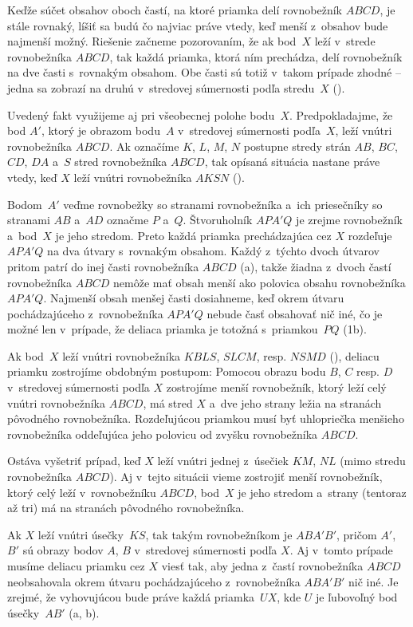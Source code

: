 {%
Keďže súčet obsahov oboch častí, na ktoré priamka delí rovnobežník $ABCD$, je stále rovnaký, líšiť sa budú čo najviac práve vtedy, keď menší z~obsahov bude najmenší možný. Riešenie začneme pozorovaním, že ak bod~$X$ leží v~strede rovnobežníka $ABCD$, tak každá priamka, ktorá ním prechádza, delí rovnobežník na dve časti s~rovnakým obsahom. Obe časti sú totiž v~takom prípade zhodné -- jedna sa zobrazí na druhú v~stredovej súmernosti podľa stredu~$X$ (\obr).

Uvedený fakt využijeme aj pri všeobecnej polohe bodu~$X$. Predpokladajme, že bod $A'$, ktorý je obrazom bodu~$A$ v~stredovej súmernosti podľa~$X$, leží vnútri rovnobežníka $ABCD$. Ak označíme $K$, $L$, $M$, $N$ postupne stredy strán $AB$, $BC$, $CD$, $DA$ a~$S$ stred rovnobežníka $ABCD$, tak opísaná situácia nastane práve vtedy, keď $X$ leží vnútri rovnobežníka $AKSN$ (\obr).
%

Bodom~$A'$ veďme rovnobežky so stranami rovnobežníka a~ich priesečníky so stranami $AB$ a~$AD$ označme $P$ a~$Q$. Štvoruholník $APA'Q$ je zrejme rovnobežník a~bod~$X$ je jeho stredom. Preto každá priamka prechádzajúca cez $X$ rozdeľuje $APA'Q$ na dva útvary s~rovnakým obsahom. Každý z~týchto dvoch útvarov pritom patrí do inej časti rovnobežníka $ABCD$ (\obr a), takže žiadna z~dvoch častí rovnobežníka $ABCD$ nemôže mať obsah menší ako polovica obsahu rovnobežníka $APA'Q$. Najmenší obsah menšej časti dosiahneme, keď okrem útvaru pochádzajúceho z~rovnobežníka $APA'Q$ nebude časť obsahovať nič iné, čo je možné len v~prípade, že deliaca priamka je totožná s~priamkou~$PQ$ (\obrr1b).
%

Ak bod~$X$ leží vnútri rovnobežníka $KBLS$, $SLCM$, resp. $NSMD$ (), deliacu priamku zostrojíme obdobným postupom: Pomocou obrazu bodu $B$, $C$ resp. $D$ v~stredovej súmernosti podľa $X$ zostrojíme menší rovnobežník, ktorý leží celý vnútri rovnobežníka $ABCD$, má stred $X$ a~dve jeho strany ležia na stranách pôvodného rovnobežníka. Rozdeľujúcou priamkou musí byť uhlopriečka menšieho rovnobežníka oddeľujúca jeho polovicu od zvyšku rovnobežníka $ABCD$.

Ostáva vyšetriť prípad, keď $X$ leží vnútri jednej z~úsečiek $KM$, $NL$ (mimo stredu rovnobežníka $ABCD$). Aj v~tejto situácii vieme zostrojiť menší rovnobežník, ktorý celý leží v~rovnobežníku $ABCD$, bod~$X$ je jeho stredom a~strany (tentoraz až tri) má na stranách pôvodného rovnobežníka.
%

Ak $X$ leží vnútri úsečky~$KS$, tak takým rovnobežníkom je $ABA'B'$, pričom $A'$, $B'$ sú obrazy bodov $A$, $B$ v~stredovej súmernosti podľa $X$.
Aj v~tomto prípade musíme deliacu priamku cez $X$ viesť tak, aby jedna z~častí rovnobežníka $ABCD$ neobsahovala okrem útvaru pochádzajúceho z~rovnobežníka $ABA'B'$ nič iné. Je zrejmé, že vyhovujúcou bude práve každá priamka~$UX$, kde $U$ je ľubovoľný bod úsečky~$AB'$ (\obr a, b).

}
